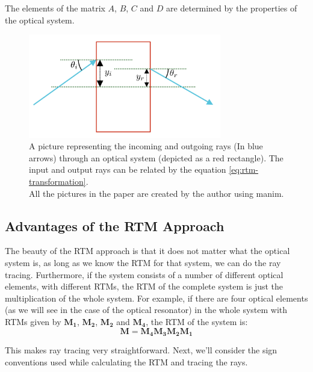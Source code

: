 \documentclass[12pt]{article}
\begin{document}
The elements of the matrix \(A\), \(B\), \(C\) and \(D\) are determined by the properties of the optical system.

\begin{figure}[h]
    \centering
    \includegraphics[width=0.75\textwidth]{images/box_c.png}
    \caption{A picture representing the incoming and outgoing rays (In blue arrows) through an optical system (depicted as a red rectangle). The input and output rays can be related by the equation \ref{eq:rtm-transformation}.\\{All the pictures in the paper are created by the author using {\color{cyan}manim}}\cite{manim}.}
    \label{fig:rtm-box}
\end{figure}
\subsection{Advantages of the RTM Approach}

The beauty of the RTM approach is that it does not matter what the optical system is, as long as we know the RTM for that system, we can do the ray tracing. Furthermore, if the system consists of a number of different optical elements, with different RTMs, the RTM of the complete system is just the multiplication of the whole system. For example, if there are four optical elements (as we will see in the case of the optical resonator) in the whole system with RTMs given by \(\mathbf{M_1}\), \(\mathbf{M_2}\), \(\mathbf{M_2}\) and \(\mathbf{M_4}\), the RTM of the system is:
\begin{equation*}
    \mathbf{M} = \mathbf{M_4}\mathbf{M_3}\mathbf{M_2}\mathbf{M_1}
\end{equation*}

This makes ray tracing very straightforward. Next, we'll consider the sign conventions used while calculating the RTM and tracing the rays.
\end{document}
